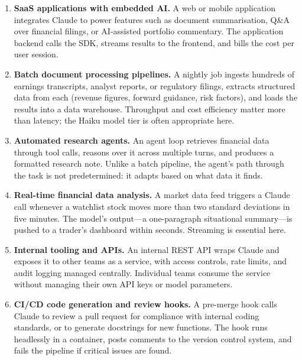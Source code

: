 \begin{enumerate}
  \item \textbf{SaaS applications with embedded AI.} A web or mobile application
        integrates Claude to power features such as document summarisation, Q\&A over
        financial filings, or AI-assisted portfolio commentary. The application backend
        calls the SDK, streams results to the frontend, and bills the cost per user
        session.

  \item \textbf{Batch document processing pipelines.} A nightly job ingests hundreds of
        earnings transcripts, analyst reports, or regulatory filings, extracts structured
        data from each (revenue figures, forward guidance, risk factors), and loads the
        results into a data warehouse. Throughput and cost efficiency matter more than
        latency; the Haiku model tier is often appropriate here.

  \item \textbf{Automated research agents.} An agent loop retrieves financial data
        through tool calls, reasons over it across multiple turns, and produces a
        formatted research note. Unlike a batch pipeline, the agent's path through the
        task is not predetermined: it adapts based on what data it finds.

  \item \textbf{Real-time financial data analysis.} A market data feed triggers a Claude
        call whenever a watchlist stock moves more than two standard deviations in five
        minutes. The model's output---a one-paragraph situational summary---is pushed
        to a trader's dashboard within seconds. Streaming is essential here.

  \item \textbf{Internal tooling and APIs.} An internal REST API wraps Claude and
        exposes it to other teams as a service, with access controls, rate limits, and
        audit logging managed centrally. Individual teams consume the service without
        managing their own API keys or model parameters.

  \item \textbf{CI/CD code generation and review hooks.} A pre-merge hook calls Claude
        to review a pull request for compliance with internal coding standards, or to
        generate docstrings for new functions. The hook runs headlessly in a container,
        posts comments to the version control system, and fails the pipeline if critical
        issues are found.
\end{enumerate}

